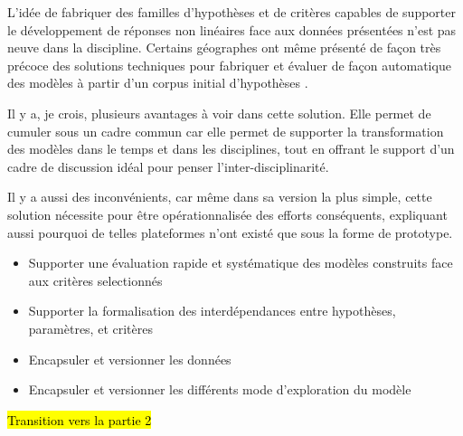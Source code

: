 L'idée de fabriquer des familles d'hypothèses et de critères capables de supporter le développement de réponses non linéaires face aux données présentées n'est pas neuve dans la discipline. Certains géographes ont même présenté de façon très précoce des solutions techniques pour fabriquer et évaluer de façon automatique des modèles à partir d'un corpus initial d'hypothèses \autocite{Openshaw1988}.

Il y a, je crois, plusieurs avantages à voir dans cette solution. Elle permet de cumuler sous un cadre commun car elle permet de supporter la transformation des modèles dans le temps et dans les disciplines, tout en offrant le support d'un cadre de discussion idéal pour penser l'inter-disciplinarité.

Il y a aussi des inconvénients, car même dans sa version la plus simple, cette solution nécessite pour être opérationnalisée des efforts conséquents, expliquant aussi pourquoi de telles plateformes n'ont existé que sous la forme de prototype.

\begin{itemize}
\item Supporter une évaluation rapide et systématique des modèles construits face aux critères selectionnés
\item Supporter la formalisation des interdépendances entre hypothèses, paramètres, et critères
\item Encapsuler et versionner les données
\item Encapsuler et versionner les différents mode d'exploration du modèle
\end{itemize}

\hl{Transition vers la partie 2}


